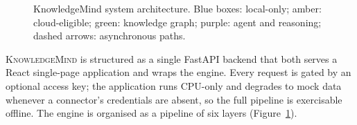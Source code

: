 \documentclass{ecai}
\newcommand{\km}{\textsc{KnowledgeMind}}
\begin{document}
\begin{figure}[h]
{}%
\caption{KnowledgeMind system architecture.
  Blue boxes: local-only; amber: cloud-eligible; green: knowledge graph;
  purple: agent and reasoning; dashed arrows: asynchronous paths.}
\label{fig:arch}
\end{figure}

\km{} is structured as a single FastAPI backend that both serves a React
single-page application and wraps the engine. Every request is gated by an
optional access key; the application runs CPU-only and degrades to mock data
whenever a connector's credentials are absent, so the full pipeline is
exercisable offline. The engine is organised as a pipeline of six layers
(Figure~\ref{fig:arch}).
\end{document}
